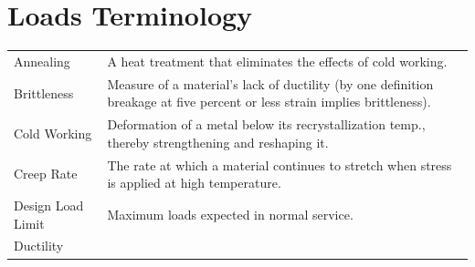 \documentclass[
]{book}
\begin{document}
\hypertarget{loads-terminology}{%
\section{Loads Terminology}\label{loads-terminology}}

\begin{longtable}[]{@{}ll@{}}
\toprule
\endhead
\begin{minipage}[t]{0.14\columnwidth}\raggedright
Annealing\strut
\end{minipage} & \begin{minipage}[t]{0.80\columnwidth}\raggedright
A heat treatment that eliminates the effects of cold working.\strut
\end{minipage}\tabularnewline
\begin{minipage}[t]{0.14\columnwidth}\raggedright
Brittleness\strut
\end{minipage} & \begin{minipage}[t]{0.80\columnwidth}\raggedright
Measure of a material's lack of ductility (by one definition breakage at five percent or less strain implies brittleness).\strut
\end{minipage}\tabularnewline
\begin{minipage}[t]{0.14\columnwidth}\raggedright
Cold Working\strut
\end{minipage} & \begin{minipage}[t]{0.80\columnwidth}\raggedright
Deformation of a metal below its recrystallization temp., thereby strengthening and reshaping it.\strut
\end{minipage}\tabularnewline
\begin{minipage}[t]{0.14\columnwidth}\raggedright
Creep Rate\strut
\end{minipage} & \begin{minipage}[t]{0.80\columnwidth}\raggedright
The rate at which a material continues to stretch when stress is applied at high temperature.\strut
\end{minipage}\tabularnewline
\begin{minipage}[t]{0.14\columnwidth}\raggedright
Design Load Limit\strut
\end{minipage} & \begin{minipage}[t]{0.80\columnwidth}\raggedright
Maximum loads expected in normal service.\strut
\end{minipage}\tabularnewline
\begin{minipage}[t]{0.14\columnwidth}\raggedright
Ductility\strut
\end{minipage} & \begin{minipage}[t]{0.80\columnwidth}\raggedright

\end{minipage}
\end{longtable}
\end{document}
